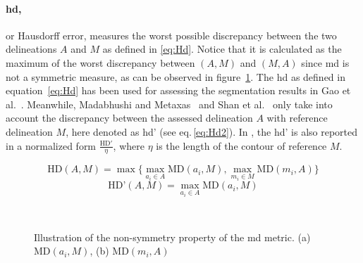 \documentclass[authoryear,preprint,review,12pt]{elsarticle}
\begin{document}
\paragraph{\acf{hd},} or Hausdorff error, measures the worst possible discrepancy between the two delineations $A$ and $M$ as defined in \ref{eq:Hd}. Notice that it is calculated as the maximum of the worst discrepancy between $(A,M)$ and  $(M,A)$ since \ac{md} is not a symmetric measure, as can be observed in figure~\ref{fig:md}. The \ac{hd} as defined in equation~\ref{eq:Hd} has been used for assessing the segmentation results in Gao et al.~\cite{Gao:2012p14336}. Meanwhile, Madabhushi and Metaxas~\cite{Madabhushi:2003p6036} and Shan et al.~\cite{Shan:2012p14347} only take into account the discrepancy between the assessed delineation $A$ with reference delineation $M$, here denoted as \ac{hd}' (see eq.\,\ref{eq:Hd2}). In \cite{Madabhushi:2003p6036,Shan:2012p14347}, the \ac{hd}' is also reported in a normalized form $\frac{\text{HD}'}{\eta}$, where $\eta$ is the length of the contour of reference $M$.

\begin{equation}
\text{HD} (A,M) = \max \bigg \{ \max_{a_i \in A} \text{MD}(a_i,M), \max_{m_i \in M} \text{MD}(m_i,A)  \bigg \}
\label{eq:Hd}
\end{equation}
\begin{equation}
\label{eq:Hd2}
\text{HD'} (A,M) = \max_{a_i \in A} \text{MD}(a_i,M)
\end{equation}

\begin{figure}[Htbp]
\centering
{}~

\caption[Non-symmetry propoerty of the \ac{md} metric.]{Illustration of the non-symmetry property of the \acf{md} metric. (a) $\text{MD}(a_i,M)$, (b) $\text{MD}(m_i,A)$}
\label{fig:md}
\end{figure}
\end{document}
